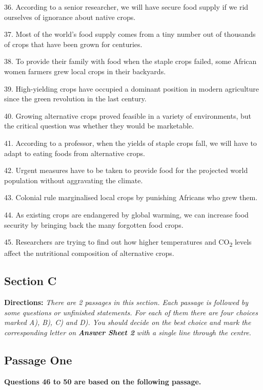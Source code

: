 \documentclass[UTF8,11pt]{ctexart}
\begin{document}
36. According to a senior researcher, we will have secure food supply if we rid ourselves of ignorance about native crops.


37. Most of the world’s food supply comes from a tiny number out of thousands of crops that have been grown for centuries.


38. To provide their family with food when the staple crops failed, some African women farmers grew local crops in their backyards.


39. High-yielding crops have occupied a dominant position in modern agriculture since the green revolution in the last century.


40. Growing alternative crops proved feasible in a variety of environments, but the critical question was whether they would be marketable.


41. According to a professor, when the yields of staple crops fall, we will have to adapt to eating foods from alternative crops.


42. Urgent measures have to be taken to provide food for the projected world population without aggravating the climate.


43. Colonial rule marginalised local crops by punishing Africans who grew them.


44. As existing crops are endangered by global warming, we can increase food security by bringing back the many forgotten food crops.


45. Researchers are trying to find out how higher temperatures and CO\textsubscript{2} levels affect the nutritional composition of alternative crops.


\subsection*{\textbf{Section C}}


\textbf{Directions: }\textit{There are 2 passages in this section. Each passage is followed by some questions or unfinished} \textit{statements. For each of them there are four choices marked A), B), C) and D). You should decide on the best choice} \textit{and mark the corresponding letter on }\textbf{\textit{Answer Sheet 2}}\textit{ with a single line through the centre.}


\subsection*{\textbf{Passage One}}


\textbf{Questions 46 to 50 are based on the following passage.}
\end{document}
